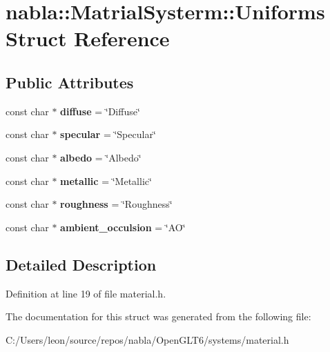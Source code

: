 \hypertarget{structnabla_1_1_matrial_systerm_1_1_uniforms}{}\section{nabla\+::Matrial\+Systerm\+::Uniforms Struct Reference}
\label{structnabla_1_1_matrial_systerm_1_1_uniforms}
\subsection*{Public Attributes}
\begin{DoxyCompactItemize}
\item 
\mbox{\label{structnabla_1_1_matrial_systerm_1_1_uniforms_ae1362865aae700ad216a21ed750da3d5}} 
const char $\ast$ {\bfseries diffuse} = \char`\"{}Diffuse\char`\"{}
\item 
\mbox{\label{structnabla_1_1_matrial_systerm_1_1_uniforms_abb63ee6b271c48f4f2cb8f3204f42e4f}} 
const char $\ast$ {\bfseries specular} = \char`\"{}Specular\char`\"{}
\item 
\mbox{\label{structnabla_1_1_matrial_systerm_1_1_uniforms_abc980f21a2760190ea05868f9b084d51}} 
const char $\ast$ {\bfseries albedo} = \char`\"{}Albedo\char`\"{}
\item 
\mbox{\label{structnabla_1_1_matrial_systerm_1_1_uniforms_a1adfbee485d880109fcfccc63d12f40a}} 
const char $\ast$ {\bfseries metallic} = \char`\"{}Metallic\char`\"{}
\item 
\mbox{\label{structnabla_1_1_matrial_systerm_1_1_uniforms_aa2d85404c377fd513b58ecb6f84125a1}} 
const char $\ast$ {\bfseries roughness} = \char`\"{}Roughness\char`\"{}
\item 
\mbox{\label{structnabla_1_1_matrial_systerm_1_1_uniforms_a95759b99a5cc6db3032aa81acfa1bdf9}} 
const char $\ast$ {\bfseries ambient\+\_\+occulsion} = \char`\"{}AO\char`\"{}
\end{DoxyCompactItemize}


\subsection{Detailed Description}


Definition at line 19 of file material.\+h.



The documentation for this struct was generated from the following file\+:\begin{DoxyCompactItemize}
\item 
C\+:/\+Users/leon/source/repos/nabla/\+Open\+G\+L\+T6/systems/material.\+h\end{DoxyCompactItemize}
